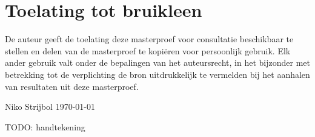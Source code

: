 \chapter*{Toelating tot bruikleen}

De auteur geeft de toelating deze masterproef voor consultatie beschikbaar te stellen en delen van de masterproef te kopiëren voor persoonlijk gebruik.
Elk ander gebruik valt onder de bepalingen van het auteursrecht, in het bijzonder met betrekking tot de verplichting de bron uitdrukkelijk te vermelden bij het aanhalen van resultaten uit deze masterproef.

Niko Strijbol
\today

TODO: handtekening
